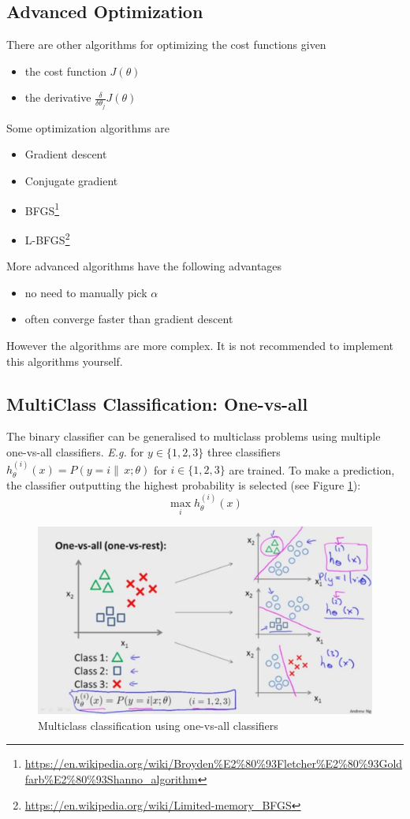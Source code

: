 \documentclass[a4paper,twoside,10pt]{article}
\begin{document}
\subsection{Advanced Optimization}
There are other algorithms for optimizing the cost functions given
\begin{itemize}
  \item the cost function $J(\theta)$
  \item the derivative $\frac{\delta}{\delta\theta_j}J(\theta)$
\end{itemize}
Some optimization algorithms are
\begin{itemize}
  \item Gradient descent
  \item Conjugate gradient
  \item \acs{BFGS}\footnote{\url{https://en.wikipedia.org/wiki/Broyden\%E2\%80\%93Fletcher\%E2\%80\%93Goldfarb\%E2\%80\%93Shanno_algorithm}}
  \item \acs{L-BFGS}\footnote{\url{https://en.wikipedia.org/wiki/Limited-memory_BFGS}}
\end{itemize}
More advanced algorithms have the following advantages
\begin{itemize}
  \item no need to manually pick $\alpha$
  \item often converge faster than gradient descent
\end{itemize}
However the algorithms are more complex. It is not recommended to implement this algorithms yourself.

\subsection{MultiClass Classification: One-vs-all}
The binary classifier can be generalised to multiclass problems using multiple one-vs-all classifiers.
\emph{E.g.} for $y\in\{1,2,3\}$ three classifiers $h_\theta^{(i)}(x)=P(y=i\|\,x;\theta)$ for $i\in\{1,2,3\}$ are trained.
To make a prediction, the classifier outputting the highest probability is selected (see Figure \ref{fig:onevsall}):
\begin{equation*}
  \mathop{\operatorname{max}}_ih_\theta^{(i)}(x)
\end{equation*}
\begin{figure}[htbp]
  \begin{center}
    \includegraphics[width=.6\textwidth]{onevsall}
    \caption{Multiclass classification using one-vs-all classifiers\citep{andrewng}\label{fig:onevsall}}
  \end{center}
\end{figure}
\end{document}
